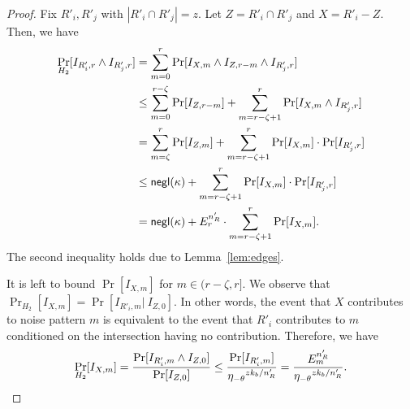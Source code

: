 \begin{proof}
Fix $R'_i, R'_j$ with $|R'_i \cap R'_j| = z$.  Let $Z = R'_i \cap R'_j$
and $X = R'_i - Z$.  
%
Then, we have 
\begin{align*}
\Pr_{H_2}[I_{R'_i,r} \wedge I_{R'_j, r}] & = 
\sum_{m=0}^r \Pr[ I_{X,m} \wedge I_{Z, r-m} \wedge I_{R'_j, r} ]\\
  & \leq \sum_{m=0}^{r-\zeta} \Pr[I_{Z, r-m}] + \sum_{m=r-\zeta+1}^r \Pr[ I_{X,m}  \wedge I_{R'_j, r} ] \\
  & = \sum_{m = \zeta}^{r} \Pr[I_{Z, m}] + \sum_{m=r-\zeta+1}^r \Pr[ I_{X,m} ] \cdot \Pr[I_{R'_j, r} ] \\
&\le  \mathsf{negl}(\kappa) + \sum_{m=r-\zeta+1}^r \Pr[I_{X, m}] \cdot \Pr[I_{R'_j, r}]\\
&= \mathsf{negl}(\kappa) + E^{n'_R}_r\cdot \sum_{m=r-\zeta+1}^r \Pr[I_{X, m}] .
\end{align*}
The second inequality holds due to Lemma~\ref{lem:edges}. 

It is left to bound $\Pr[I_{X, m}]$ for $m \in (r-\zeta, r]$. We observe
that 
$\Pr_{H_2}[I_{X, m}] = \Pr[I_{R'_i, m} |~ I_{Z, 0}]$. 
%
In other words, the event that $X$ contributes to noise pattern $m$ is
equivalent to the event that $R'_i$ contributes to $m$ conditioned on the
intersection having no contribution.
%
Therefore, we have 
 \[ \Pr_{H_2}[I_{X, m}] = \frac{\Pr[I_{R'_i, m} \wedge I_{Z, 0}]}{ \Pr[I_{Z,0}] }
 \le \frac{\Pr[I_{R'_i, m}]}{ {\eta_{-\theta}}^{z k_b/n'_R} } = 
 \frac{E^{n'_R}_{m}}{ {\eta_{-\theta}}^{z k_b/n'_R} }.\]


\end{proof}
